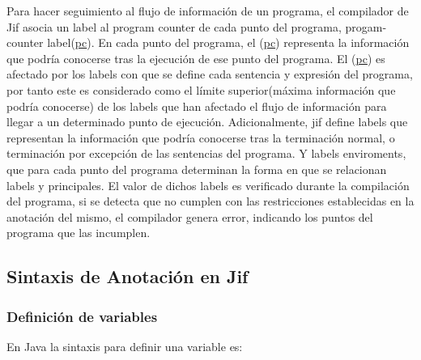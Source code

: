 Para hacer seguimiento al flujo de información de un programa, el compilador de
Jif asocia un label al program counter de cada punto del programa,
progam-counter label(\underline{pc}). En cada punto del programa, el
(\underline{pc}) representa la información que podría conocerse tras la
ejecución de ese punto del programa.
El (\underline{pc}) es afectado por los labels con que se define cada sentencia
y expresión del programa, por tanto este es considerado como el límite
superior(máxima información que podría conocerse) de los labels que han afectado
el flujo de información para llegar a un determinado punto de ejecución.\newline
Adicionalmente, jif define labels que representan la información que podría
conocerse tras la terminación normal, o terminación por excepción de las
sentencias del programa. Y labels enviroments, que para cada punto del programa
determinan la forma en que se relacionan labels y principales.\newline
El valor de dichos labels es verificado durante la compilación del programa, si
se detecta que no cumplen con las restricciones establecidas en la anotación del
mismo, el compilador genera error, indicando los puntos del programa que las
incumplen.\newline



\subsection{Sintaxis de Anotación en Jif}
\label{sssec:JifSintax} 

\subsubsection{Definición de variables}
En Java la sintaxis para definir una variable es:

